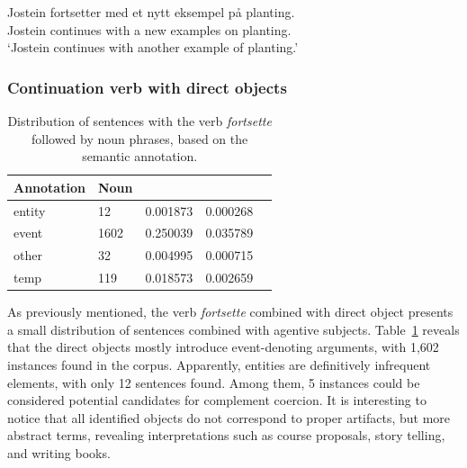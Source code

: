 \documentclass{article}
\begin{document}
        \gll Jostein fortsetter med et nytt eksempel på planting.\\
             Jostein continues with a new examples on planting.\\
        \glt ‘Jostein continues with another example of planting.’
        \z
        
\subsubsection{Continuation verb with direct objects}
\begin{table}[h]
    \centering
    \begin{tabular}{llrrr}
    \toprule
    Annotation &  Noun\\
    \midrule
    entity & 12 & 0.001873 & 0.000268 \\
    event & 1602 & 0.250039 & 0.035789 \\
    other & 32 & 0.004995 & 0.000715 \\
    temp & 119 & 0.018573 & 0.002659 \\
    \bottomrule
    \end{tabular}
    \caption{Distribution of sentences with the verb \emph{fortsette} followed by noun phrases, based on the semantic annotation.}
    \label{tab:fortsette_semantic_noun}
\end{table}
\noindent As previously mentioned, the verb \emph{fortsette} combined with direct object presents a small distribution of sentences combined with agentive subjects. Table~\ref{tab:fortsette_semantic_noun} reveals that the direct objects mostly introduce event-denoting arguments, with 1,602 instances found in the corpus. Apparently, entities are definitively infrequent elements, with only 12 sentences found. Among them, 5 instances could be considered potential candidates for complement coercion. It is interesting to notice that all identified objects do not correspond to proper artifacts, but more abstract terms, revealing interpretations such as course proposals, story telling, and writing books.
\end{document}
